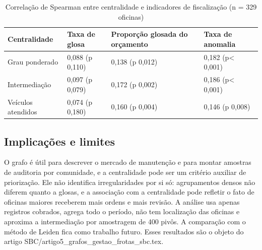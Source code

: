 \begin{table}[H]
\centering\small
\caption{Correlação de Spearman entre centralidade e indicadores de fiscalização (n = 329 oficinas)}
\label{tab:grafos-spearman}
\begin{tabular}{lp{}p{}p{}}
\hline
\textbf{Centralidade} & \textbf{Taxa de glosa} & \textbf{Proporção glosada do orçamento} & \textbf{Taxa de anomalia} \\ \hline
Grau ponderado & 0,088 (p 0,110) & 0,138 (p 0,012) & 0,182 (p< 0,001) \\
Intermediação & 0,097 (p 0,079) & 0,172 (p 0,002) & 0,186 (p< 0,001) \\
Veículos atendidos & 0,074 (p 0,180) & 0,160 (p 0,004) & 0,146 (p 0,008) \\
\hline
\end{tabular}
\end{table}

\subsection{Implicações e limites}

O grafo é útil para descrever o mercado de manutenção e para montar amostras de auditoria por comunidade, e a centralidade pode ser um critério auxiliar de priorização. Ele não identifica irregularidades por si só: agrupamentos densos não diferem quanto a glosas, e a associação com a centralidade pode refletir o fato de oficinas maiores receberem mais ordens e mais revisão. A análise usa apenas registros cobrados, agrega todo o período, não tem localização das oficinas e aproxima a intermediação por amostragem de 400 pivôs. A comparação com o método de Leiden \cite{traag2019} fica como trabalho futuro. Esses resultados são o objeto do artigo SBC/artigo5\_grafos\_gestao\_frotas\_sbc.tex.
